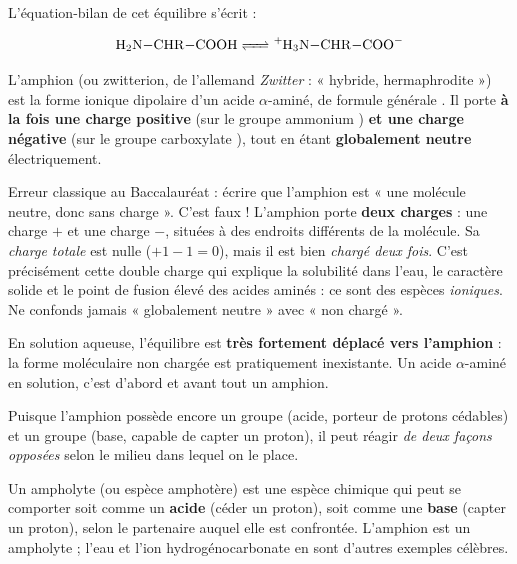 \documentclass[11pt]{article}
\newcommand{\cle}[1]{{\popxbold\color{popdark}#1}}
\newcounter{popsec}
\newcounter{popsub}
\newcommand{\courssub}[1]{%
  \stepcounter{popsub}%
  \par\vspace{9pt}\noindent{\popxbold\fontsize{11.5}{13}\selectfont\color{popink}{\color{poporange}\thepopsec.\thepopsub}\hspace{6pt}#1}\par\nopagebreak\vspace{4pt}
}
\begin{document}
L'équation-bilan de cet équilibre s'écrit :

\[ \ce{H2N-CHR-COOH <=> ^{+}H3N-CHR-COO^{-}} \]

\begin{definition}
L'\cle{amphion} (ou \cle{zwitterion}, de l'allemand \emph{Zwitter} : « hybride, hermaphrodite ») est la forme ionique dipolaire d'un acide $\alpha$-aminé, de formule générale . Il porte \textbf{à la fois une charge positive} (sur le groupe ammonium ) \textbf{et une charge négative} (sur le groupe carboxylate ), tout en étant \textbf{globalement neutre} électriquement.
\end{definition}

\begin{attention}
Erreur classique au Baccalauréat : écrire que l'amphion est « une molécule neutre, donc sans charge ». C'est faux ! L'amphion porte \textbf{deux charges} : une charge $+$ et une charge $-$, situées à des endroits différents de la molécule. Sa \emph{charge totale} est nulle ($+1-1=0$), mais il est bien \emph{chargé deux fois}. C'est précisément cette double charge qui explique la solubilité dans l'eau, le caractère solide et le point de fusion élevé des acides aminés : ce sont des espèces \emph{ioniques}. Ne confonds jamais « globalement neutre » avec « non chargé ».
\end{attention}

\begin{aretenir}
En solution aqueuse, l'équilibre  est \textbf{très fortement déplacé vers l'amphion} : la forme moléculaire non chargée est pratiquement inexistante. Un acide $\alpha$-aminé en solution, c'est d'abord et avant tout un amphion.
\end{aretenir}

\courssub{L'amphion est un ampholyte}

Puisque l'amphion possède encore un groupe  (acide, porteur de protons cédables) et un groupe  (base, capable de capter un proton), il peut réagir \emph{de deux façons opposées} selon le milieu dans lequel on le place.

\begin{definition}[Ampholyte]
Un \cle{ampholyte} (ou espèce \cle{amphotère}) est une espèce chimique qui peut se comporter soit comme un \textbf{acide} (céder un proton), soit comme une \textbf{base} (capter un proton), selon le partenaire auquel elle est confrontée. L'amphion  est un ampholyte ; l'eau  et l'ion hydrogénocarbonate  en sont d'autres exemples célèbres.
\end{definition}
\end{document}
